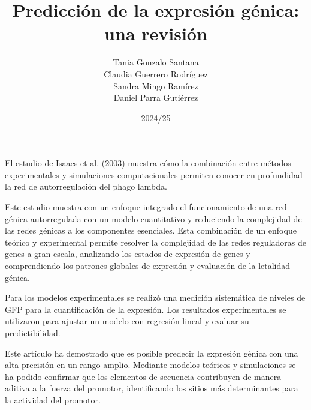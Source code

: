 \documentclass[nochap]{config/ejercicios}
\title{Predicción de la expresión génica: una revisión}
\author{Tania Gonzalo Santana \\ Claudia Guerrero Rodríguez \\ Sandra Mingo Ramírez \\ Daniel Parra Gutiérrez }
\date{2024/25}
\begin{document}
\maketitle

El estudio de Isaacs et al. (2003) muestra cómo la combinación entre métodos experimentales y simulaciones computacionales permiten conocer en profundidad la red de autorregulación del phago lambda.



Este estudio muestra con un enfoque integrado el funcionamiento de una red génica autorregulada con un modelo cuantitativo y reduciendo la complejidad de las redes génicas a los componentes esenciales. Esta combinación de un enfoque teórico y experimental permite resolver la complejidad de las redes reguladoras de genes a gran escala, analizando los estados de expresión de genes y comprendiendo los patrones globales de expresión y evaluación de la letalidad génica.


Para los modelos experimentales se realizó una medición sistemática de niveles de GFP para la cuantificación de la expresión. Los resultados experimentales se utilizaron para ajustar un modelo con regresión lineal y evaluar su predictibilidad. 


Este artículo ha demostrado que es posible predecir la expresión génica con una alta precisión en un rango amplio. Mediante modelos teóricos y simulaciones se ha podido confirmar que los elementos de secuencia contribuyen de manera aditiva a la fuerza del promotor, identificando los sitios más determinantes para la actividad del promotor.
\end{document}
